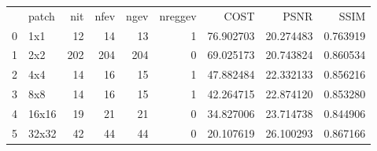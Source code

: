 \begin{tabular}{llrrrrrrr}
 & patch & nit & nfev & ngev & nreggev & COST & PSNR & SSIM \\
0 & 1x1 & 12 & 14 & 13 & 1 & 76.902703 & 20.274483 & 0.763919 \\
1 & 2x2 & 202 & 204 & 204 & 0 & 69.025173 & 20.743824 & 0.860534 \\
2 & 4x4 & 14 & 16 & 15 & 1 & 47.882484 & 22.332133 & 0.856216 \\
3 & 8x8 & 14 & 16 & 15 & 1 & 42.264715 & 22.874120 & 0.853280 \\
4 & 16x16 & 19 & 21 & 21 & 0 & 34.827006 & 23.714738 & 0.844906 \\
5 & 32x32 & 42 & 44 & 44 & 0 & 20.107619 & 26.100293 & 0.867166 \\
\end{tabular}

